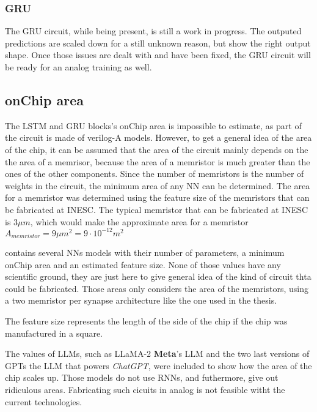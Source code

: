 \subsubsection{\ac{GRU}}

The \ac{GRU} circuit, while being present, is still a work in progress. The outputed predictions are scaled down for a still unknown reason, but show the right output shape. Once those issues are dealt with and have been fixed, the \ac{GRU} circuit will be ready for an analog training as well.

\subsection{onChip area}\label{subsec:area}

The \ac{LSTM} and \ac{GRU} blocks's onChip area is impossible to estimate, as part of the circuit is made of verilog-A models. However, to get a general idea of the area of the chip, it can be assumed that the area of the circuit mainly depends on the the area of a memrisor, because the area of a memristor is much greater than the ones of the other components. Since the number of memristors is the number of weights in the circuit, the minimum area of any \ac{NN} can be determined. The area for a memristor was determined using the feature size of the memristors that can be fabricated at \ac{INESC}. The typical memristor that can be fabricated at \ac{INESC} is $3\mu m$, which would make the approximate area for a memristor $A_{memristor}=9\mu m^2=9\cdot 10^{-12} m^2$

 contains several \acp{NN} models with their number of parameters, a minimum onChip area and an estimated feature size. None of those values have any scientific ground, they are just here to give general idea of the kind of circuit thta could be fabricated. Those areas only considers the area of the memristors, using a two memristor per synapse architecture like the one used in the thesis.

The feature size represents the length of the side of the chip if the chip was manufactured in a square.

The values of \acp{LLM}, such as \ac{LLaMA}-2 \textbf{Meta}'s \ac{LLM} and the two last versions of \acp{GPT} the \ac{LLM} that powers \textit{ChatGPT}, were included to show how the area of the chip scales up. Those models do not use \acp{RNN}, and futhermore, give out ridiculous areas. Fabricating such cicuits in analog is not feasible witht the current technologies.

